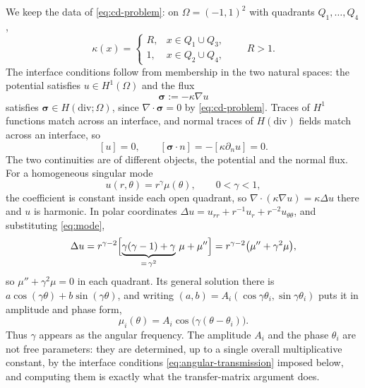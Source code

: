 \documentclass[10pt,pdftex]{amsart}%
\numberwithin{equation}{section}
\newcommand{\bsig}{\boldsymbol{\sigma}}
\begin{document}
We keep the data of \eqref{eq:cd-problem}: on $\Omega=(-1,1)^2$ with quadrants $Q_1,\ldots,Q_4$,
\begin{equation}\label{eq:kappa}
 \kappa(x)=
 \begin{cases}
 R,&x\in Q_1\cup Q_3,\\
 1,&x\in Q_2\cup Q_4,
 \end{cases}
 \qquad R>1.
\end{equation}
The interface conditions follow from membership in the two natural spaces: the potential satisfies $u\in H^1(\Omega)$ and the flux
\begin{equation}\label{eq:flux}
  \bsig:=-\kappa\nabla u
\end{equation}
satisfies $\bsig\in H(\mathrm{div};\Omega)$, since $\nabla\cdot\bsig=0$ by \eqref{eq:cd-problem}.  Traces of $H^1$ functions match across an interface, and normal traces of $H(\mathrm{div})$ fields match across an interface, so
\begin{equation}\label{eq:transmission}
 [u]=0,\qquad [\bsig\cdot n]=-[\kappa\partial_nu]=0 .
\end{equation}
The two continuities are of different objects, the potential and the normal flux.
For a homogeneous singular mode
\begin{equation}\label{eq:mode}
 u(r,\theta)=r^\gamma\mu(\theta),\qquad 0<\gamma<1,
\end{equation}
the coefficient is constant inside each open quadrant, so $\nabla\cdot(\kappa\nabla u)=\kappa\Delta u$ there and $u$ is harmonic.  In polar coordinates $\Delta u=u_{rr}+r^{-1}u_r+r^{-2}u_{\theta\theta}$, and substituting \eqref{eq:mode},
\begin{equation}\label{eq:laplacian}
  \Delta u
  =r^{\gamma-2}\Bigl[\underbrace{\gamma(\gamma-1)+\gamma}_{=\,\gamma^2}\,\mu+\mu''\Bigr]
  =r^{\gamma-2}\bigl(\mu''+\gamma^2\mu\bigr),
\end{equation}
so $\mu''+\gamma^2\mu=0$ in each quadrant.  Its general solution there is $a\cos(\gamma\theta)+b\sin(\gamma\theta)$, and writing $(a,b)=A_i(\cos\gamma\theta_i,\sin\gamma\theta_i)$ puts it in amplitude and phase form,
\begin{equation}\label{eq:sector}
 \mu_i(\theta)=A_i\cos\bigl(\gamma(\theta-\theta_i)\bigr).
\end{equation}
Thus $\gamma$ appears as the angular frequency.  The amplitude $A_i$ and the phase $\theta_i$ are not free parameters: they are determined, up to a single overall multiplicative constant, by the interface conditions \eqref{eq:angular-transmission} imposed below, and computing them is exactly what the transfer-matrix argument does.
\end{document}
